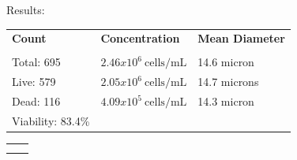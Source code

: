 \documentclass[UTF8,10pt,a4paper,fontset=fandol]{ctexart}
\newcommand{\fieldvalue}[1]{#1}
\begin{document}
\begin{center}
\begin{center}
Results:

\begin{tabularx}{\textwidth}{XXX}
\textbf{Count} & \textbf{Concentration} & \textbf{Mean Diameter} \\
\underline{\hspace{3.5cm}} &
\underline{\hspace{3.5cm}} &
\underline{\hspace{3.5cm}} \\

Total:
\fieldvalue{695}
&
\fieldvalue{$2.46x10^6\ \mathrm{cells/mL}$}
&
\fieldvalue{14.6 micron}
\\

Live:
\fieldvalue{579}
&
\fieldvalue{$2.05x10^6\ \mathrm{cells/mL}$}
&
\fieldvalue{14.7 microns}
\\

Dead:
\fieldvalue{116}
&
\fieldvalue{$4.09x10^5\ \mathrm{cells/mL}$}
&
\fieldvalue{14.3 micron}
\\

Viability:
\fieldvalue{83.4\%}
&
&
\end{tabularx}

\vspace{0.5em}

\begin{center}
\begin{tabular}{cc}
\fbox{\rule{0pt}{4.0cm}\rule{0.43\textwidth}{0pt}} &
\fbox{\rule{0pt}{4.0cm}\rule{0.43\textwidth}{0pt}} \\[1em]
\fbox{\rule{0pt}{4.0cm}\rule{0.43\textwidth}{0pt}} &
\fbox{\rule{0pt}{4.0cm}\rule{0.43\textwidth}{0pt}}
\end{tabular}
\end{center}


\end{center}
\end{center}
\end{document}
